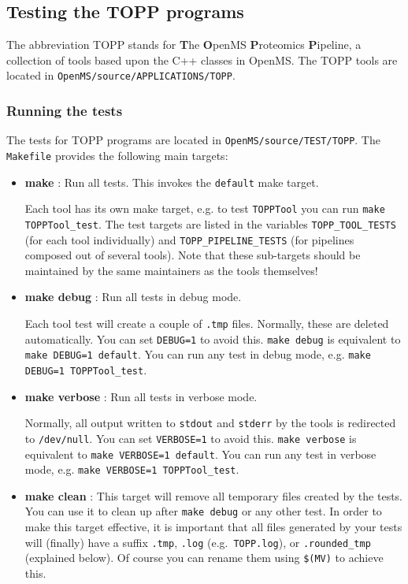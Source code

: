 \documentclass[a4]{article}
\begin{document}
\subsection{Testing the TOPP programs}

The abbreviation TOPP stands for \textbf{T}he \textbf{O}penMS
\textbf{P}roteomics \textbf{P}ipeline, a collection of tools based upon the
C++ classes in OpenMS.  The TOPP tools are located in \texttt{OpenMS/source/APPLICATIONS/TOPP}.

\subsubsection{Running the tests}

The tests for TOPP programs are located in \texttt{OpenMS/source/TEST/TOPP}.
The \texttt{Makefile} provides the following main targets:
\begin{itemize}
 \item \textbf{make} : Run all tests.  This invokes the \texttt{default} make target.

  Each tool has its own make target, e.g. to test \texttt{TOPPTool}
  you can run \texttt{make TOPPTool\_test}.  The test targets are listed in
  the variables \texttt{TOPP\_TOOL\_TESTS} (for each tool individually) and
  \texttt{TOPP\_PIPELINE\_TESTS} (for pipelines composed out of several
  tools).  Note that these sub-targets should be maintained by the same
  maintainers as the tools themselves!

 \item \textbf{make debug} : Run all tests in debug mode.

  Each tool test will create a couple of \texttt{.tmp} files.  Normally, these
  are deleted automatically.  You can set \texttt{DEBUG=1} to avoid this.
  \texttt{make debug} is equivalent to \texttt{make DEBUG=1 default}.  You can
  run any test in debug mode, e.g.  \texttt{make DEBUG=1 TOPPTool\_test}.

 \item \textbf{make verbose} : Run all tests in verbose mode.

  Normally, all output written to \texttt{stdout} and \texttt{stderr} by the
  tools is redirected to \texttt{/dev/null}.  You can set \texttt{VERBOSE=1}
  to avoid this.  \texttt{make verbose} is equivalent to \texttt{make
    VERBOSE=1 default}.  You can run any test in verbose mode, e.g.
  \texttt{make VERBOSE=1 TOPPTool\_test}.

 \item \textbf{make clean} : This target will remove all temporary files
  created by the tests.  You can use it to clean up after \texttt{make debug}
  or any other test.  In order to make this target effective, it is important
  that all files generated by your tests will (finally) have a suffix
  \texttt{.tmp}, \texttt{.log} (e.g.\ \texttt{TOPP.log}), or
  \texttt{.rounded\_tmp} (explained below).  Of course you can rename them
  using \texttt{\$(MV)} to achieve this.

\end{itemize}
\end{document}
